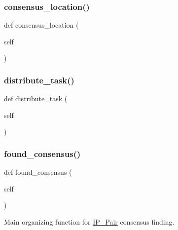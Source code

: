 \mbox{\label{classdynamicfilterapp_1_1models_1_1_i_p___pair_a9a807d3f1cbfc022e836d62ee6b71477}} 
\subsubsection{\texorpdfstring{consensus\_location()}{consensus\_location()}}
{\footnotesize\ttfamily def consensus\+\_\+location (\begin{DoxyParamCaption}\item[{}]{self }\end{DoxyParamCaption})}

\mbox{\label{classdynamicfilterapp_1_1models_1_1_i_p___pair_a2222560950a1e6f6b3a67c30d802c16e}} 
\subsubsection{\texorpdfstring{distribute\_task()}{distribute\_task()}}
{\footnotesize\ttfamily def distribute\+\_\+task (\begin{DoxyParamCaption}\item[{}]{self }\end{DoxyParamCaption})}

\mbox{\label{classdynamicfilterapp_1_1models_1_1_i_p___pair_a9b963fe3640eebb2f1fe833cb906a13d}} 
\subsubsection{\texorpdfstring{found\_consensus()}{found\_consensus()}}
{\footnotesize\ttfamily def found\+\_\+consensus (\begin{DoxyParamCaption}\item[{}]{self }\end{DoxyParamCaption})}



Main organizing function for \mbox{\hyperlink{classdynamicfilterapp_1_1models_1_1_i_p___pair}{I\+P\+\_\+\+Pair}} consensus finding. 

